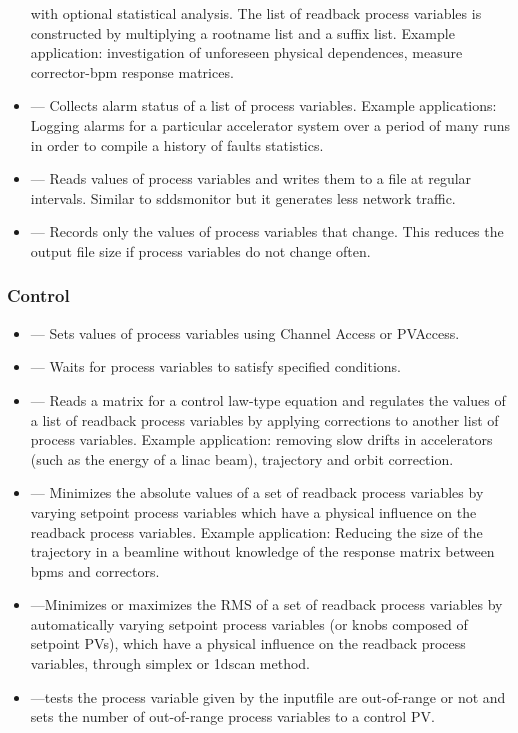 \documentclass[11pt]{article}
\begin{document}
\begin{itemize}
        with optional statistical analysis. The list of readback process variables is
        constructed by multiplying a rootname list and a suffix list.  Example
        application: investigation of unforeseen physical dependences, measure
        corrector-bpm response matrices.
  \item {} --- Collects alarm status of a list of process variables.
        Example applications: Logging alarms for a particular accelerator system over a period of
        many runs in order to compile a history of faults statistics.
  \item {} --- Reads values of process variables and writes them to a file at regular intervals. Similar to sddsmonitor but it generates less network traffic.
  \item {} --- Records only the values of process variables that change. This reduces the output file size if process variables do not change often.
\end{itemize}

\subsubsection{Control}
\begin{itemize}
  \item {} --- Sets values of process variables using Channel Access or PVAccess.
  \item {} --- Waits for process variables to satisfy specified conditions.
  \item {} --- Reads a matrix for a control law-type equation and regulates the
values of a list of readback process variables by applying corrections to another list of process variables.
        Example application: removing slow drifts in accelerators (such as the energy of a linac beam), trajectory
        and orbit correction.
  \item {} --- Minimizes the absolute values of a set of readback process variables
        by varying setpoint process variables which have a physical influence on the readback process variables.
        Example application: Reducing the size of the trajectory in a beamline without knowledge of the
        response matrix between bpms and correctors.
  \item {} ---Minimizes or maximizes the RMS of a set of readback process variables by automatically varying setpoint process variables (or knobs composed of setpoint PVs), which have a physical influence on the readback process variables, through simplex or 1dscan method.
  \item {} ---tests the process variable given by the inputfile are out-of-range or not and sets the number of out-of-range process variables to a control PV.
\end{itemize}
\end{document}
